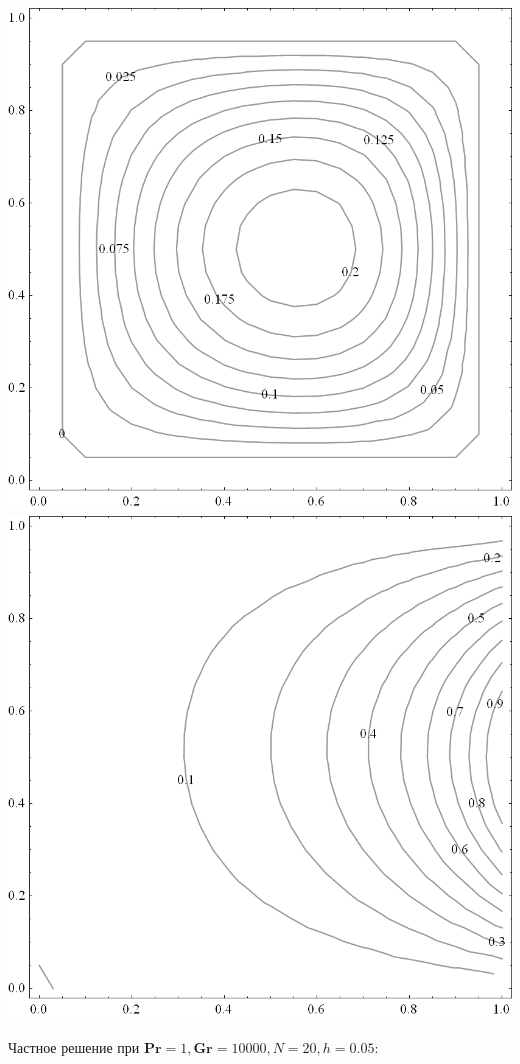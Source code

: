 \documentclass[a4paper, 12pt]{article}
\newcommand{\Pra}{\mathbf{Pr}}
\newcommand{\Gra}{\mathbf{Gr}}
\begin{document}
    \includegraphics[scale=0.25]{images/psi_100.png}
    \qquad
    \includegraphics[scale=0.25]{images/t_100.png}

    \bigskip
    Частное решение при $\Pra = 1, \Gra = 10000, N = 20, h = 0.05$:
    \bigskip
\end{document}

